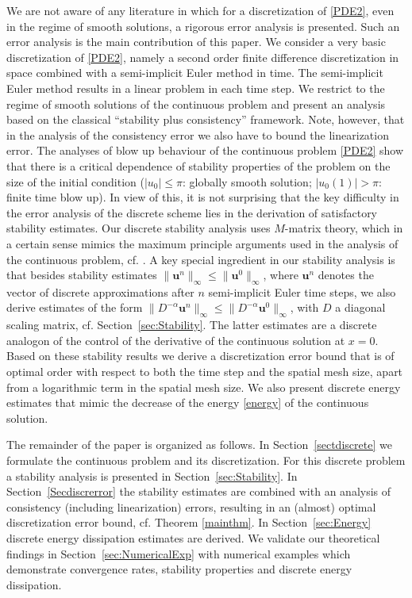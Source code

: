\documentclass{siamltex}
\newcommand{\bu}{\mathbf u}
\begin{document}
We are not aware of any literature in which for a discretization of \eqref{PDE2}, even in the regime of smooth solutions, a rigorous error analysis is presented. Such an error analysis is the main contribution of this paper. We consider a very basic discretization of \eqref{PDE2}, namely a second order finite difference discretization in space  combined with a semi-implicit Euler method in time. The semi-implicit Euler method results in a linear problem in each time step. We restrict to the regime of smooth solutions of the continuous problem and present an analysis based on the classical ``stability plus consistency'' framework. Note, however, that in the analysis of the consistency error we also have to bound the linearization error.  The  analyses of blow up behaviour of the continuous problem \eqref{PDE2} show that there is a critical dependence of stability properties of the problem on  the size of the initial condition  ($|u_0| \leq \pi$: globally smooth solution; $|u_0(1)| >\pi$: finite time blow up).   In view of this, it is not surprising that the key difficulty in the error analysis of the discrete scheme lies in the derivation of satisfactory stability estimates. Our discrete stability analysis uses $M$-matrix theory, which in a certain sense mimics the maximum principle arguments used in the analysis of the continuous problem, cf. \cite{Chang1991}. A key special ingredient in our stability analysis is that besides stability estimates $\|\bu^n\|_\infty \leq \|\bu^0\|_\infty$, where $\bu^n$ denotes the vector of discrete approximations after $n$ semi-implicit Euler time steps, we also derive estimates of the form $ \|D^{-\alpha}\bu^n\|_\infty \leq \|D^{-\alpha}\bu^0\|_\infty$, with $D$ a diagonal scaling matrix, cf. Section~\ref{sec:Stability}. The latter estimates are a discrete analogon of the control of the derivative of the continuous solution at $x=0$. Based on these stability results  we derive a discretization error bound that is of optimal order with respect to both the time step and the spatial mesh size, apart from a logarithmic term in the spatial mesh size. We also present discrete energy estimates that mimic the decrease of the energy \eqref{energy} of the continuous solution.   

The remainder of the paper is organized  as follows.  In Section~\ref{sectdiscrete} we formulate the continuous problem and its discretization. For this discrete problem a   stability analysis is presented in Section~\ref{sec:Stability}. In Section~\ref{Secdiscrerror} the stability estimates are combined with an analysis of consistency (including linearization) errors, resulting in an (almost) optimal discretization error bound, cf. Theorem \ref{mainthm}. In Section~\ref{sec:Energy} discrete energy dissipation estimates are derived. We validate our theoretical findings in Section~\ref{sec:NumericalExp} with numerical examples which demonstrate convergence rates, stability properties and discrete energy dissipation.
\end{document}
